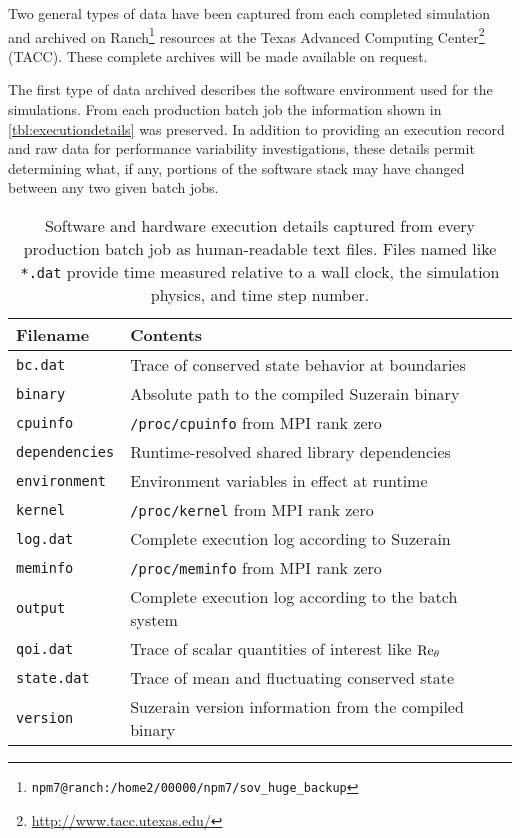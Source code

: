 \label{sec:archiving}


Two general types of data have been captured from each completed
simulation and archived on 
Ranch\footnote{%
    \texttt{npm7@ranch:/home2/00000/npm7/sov_huge_backup}
}
resources at the Texas Advanced Computing Center\footnote{%
    \url{http://www.tacc.utexas.edu/}
}
(TACC).  These complete archives will be made available on request. 

The first type of data archived describes the software environment used for the
simulations.  From each production batch job the information shown in
\autoref{tbl:executiondetails} was preserved.
%
In addition to providing an execution record and raw data for performance
variability investigations, these details permit determining what, if any,
portions of the software stack may have changed between any two given batch
jobs.

\begin{table}
\centering
\caption[Execution details captured from each production batch job]{%
  Software and hardware execution details captured from every production batch
  job as human-readable text files.  Files named like \texttt{*.dat} provide time
  measured relative to a wall clock, the simulation physics, and time step
  number.\label{tbl:executiondetails}
}
\begin{small}
\begin{tabular}{p{}|p{}}
Filename & Contents \\ \hline \hline
\texttt{bc.dat}       & Trace of conserved state behavior at boundaries \\
\texttt{binary}       & Absolute path to the compiled Suzerain binary \\
\texttt{cpuinfo}      & \texttt{/proc/cpuinfo} from MPI rank zero \\
\texttt{dependencies} & Runtime-resolved shared library dependencies \\
\texttt{environment}  & Environment variables in effect at runtime \\
\texttt{kernel}       & \texttt{/proc/kernel} from MPI rank zero \\
\texttt{log.dat}      & Complete execution log according to Suzerain \\
\texttt{meminfo}      & \texttt{/proc/meminfo} from MPI rank zero \\
\texttt{output}       & Complete execution log according to the batch system \\
\texttt{qoi.dat}      & Trace of scalar quantities of interest like $\Reynolds[\theta]{}$ \\
\texttt{state.dat}    & Trace of mean and fluctuating conserved state \\
\texttt{version}      & Suzerain version information from the compiled binary
\end{tabular}
\end{small}
\end{table}

